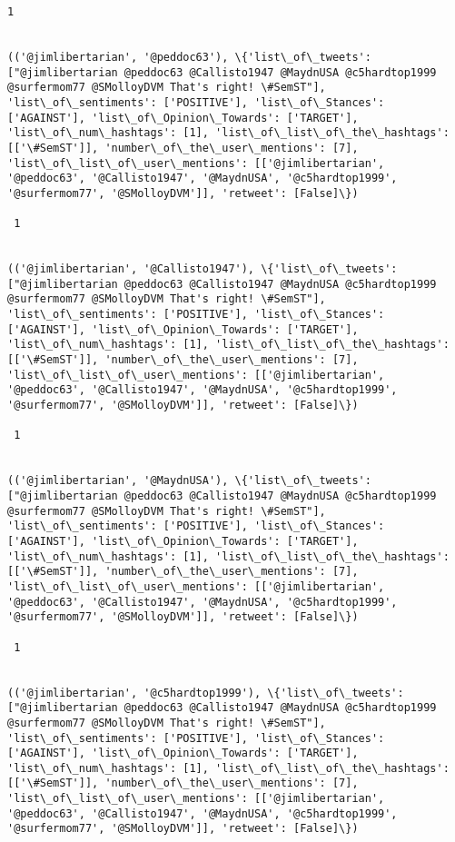 \documentclass[11pt]{article}
\begin{document}
\begin{Verbatim}[commandchars=\\\{\}]
 1
 

(('@jimlibertarian', '@peddoc63'), \{'list\_of\_tweets': ["@jimlibertarian @peddoc63 @Callisto1947 @MaydnUSA @c5hardtop1999 @surfermom77 @SMolloyDVM That's right! \#SemST"], 'list\_of\_sentiments': ['POSITIVE'], 'list\_of\_Stances': ['AGAINST'], 'list\_of\_Opinion\_Towards': ['TARGET'], 'list\_of\_num\_hashtags': [1], 'list\_of\_list\_of\_the\_hashtags': [['\#SemST']], 'number\_of\_the\_user\_mentions': [7], 'list\_of\_list\_of\_user\_mentions': [['@jimlibertarian', '@peddoc63', '@Callisto1947', '@MaydnUSA', '@c5hardtop1999', '@surfermom77', '@SMolloyDVM']], 'retweet': [False]\})

 1
 

(('@jimlibertarian', '@Callisto1947'), \{'list\_of\_tweets': ["@jimlibertarian @peddoc63 @Callisto1947 @MaydnUSA @c5hardtop1999 @surfermom77 @SMolloyDVM That's right! \#SemST"], 'list\_of\_sentiments': ['POSITIVE'], 'list\_of\_Stances': ['AGAINST'], 'list\_of\_Opinion\_Towards': ['TARGET'], 'list\_of\_num\_hashtags': [1], 'list\_of\_list\_of\_the\_hashtags': [['\#SemST']], 'number\_of\_the\_user\_mentions': [7], 'list\_of\_list\_of\_user\_mentions': [['@jimlibertarian', '@peddoc63', '@Callisto1947', '@MaydnUSA', '@c5hardtop1999', '@surfermom77', '@SMolloyDVM']], 'retweet': [False]\})

 1
 

(('@jimlibertarian', '@MaydnUSA'), \{'list\_of\_tweets': ["@jimlibertarian @peddoc63 @Callisto1947 @MaydnUSA @c5hardtop1999 @surfermom77 @SMolloyDVM That's right! \#SemST"], 'list\_of\_sentiments': ['POSITIVE'], 'list\_of\_Stances': ['AGAINST'], 'list\_of\_Opinion\_Towards': ['TARGET'], 'list\_of\_num\_hashtags': [1], 'list\_of\_list\_of\_the\_hashtags': [['\#SemST']], 'number\_of\_the\_user\_mentions': [7], 'list\_of\_list\_of\_user\_mentions': [['@jimlibertarian', '@peddoc63', '@Callisto1947', '@MaydnUSA', '@c5hardtop1999', '@surfermom77', '@SMolloyDVM']], 'retweet': [False]\})

 1
 

(('@jimlibertarian', '@c5hardtop1999'), \{'list\_of\_tweets': ["@jimlibertarian @peddoc63 @Callisto1947 @MaydnUSA @c5hardtop1999 @surfermom77 @SMolloyDVM That's right! \#SemST"], 'list\_of\_sentiments': ['POSITIVE'], 'list\_of\_Stances': ['AGAINST'], 'list\_of\_Opinion\_Towards': ['TARGET'], 'list\_of\_num\_hashtags': [1], 'list\_of\_list\_of\_the\_hashtags': [['\#SemST']], 'number\_of\_the\_user\_mentions': [7], 'list\_of\_list\_of\_user\_mentions': [['@jimlibertarian', '@peddoc63', '@Callisto1947', '@MaydnUSA', '@c5hardtop1999', '@surfermom77', '@SMolloyDVM']], 'retweet': [False]\})


\end{Verbatim}
\end{document}
